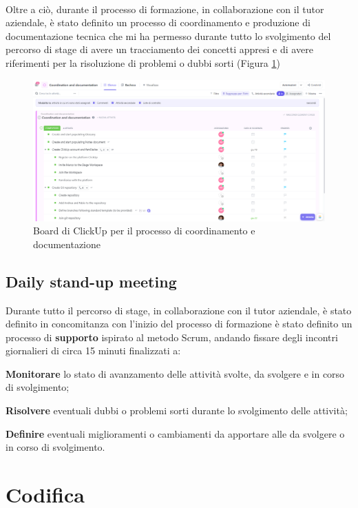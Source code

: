 \\
Oltre a ciò, durante il processo di formazione, in collaborazione con il tutor aziendale, è stato definito un processo di coordinamento e produzione di 
documentazione tecnica che mi ha permesso durante tutto lo svolgimento del percorso di stage di avere un tracciamento dei concetti appresi 
e di avere riferimenti per la risoluzione di problemi o dubbi sorti (Figura \ref{cap:Documentazione})
\begin{figure}[h]
    \centering
    \includegraphics[width=1\textwidth]{images/percorso/coordinamento.png}
    \caption{Board di ClickUp per il processo di coordinamento e documentazione}
    \label{cap:Documentazione}
\end{figure}
\subsection{Daily stand-up meeting}
Durante tutto il percorso di stage, in collaborazione con il tutor aziendale, è stato definito in concomitanza con l'inizio del processo di formazione
è stato definito un processo di \textbf{supporto} ispirato al metodo \gls{Scrum}{}, andando fissare degli incontri giornalieri di circa 15 minuti finalizzati a:
\begin{list}{*}
    \item \textbf{Monitorare} lo stato di avanzamento delle attività svolte, da svolgere e in corso di svolgimento;
    \item \item \textbf{Risolvere} eventuali dubbi o problemi sorti durante lo svolgimento delle attività;
    \item \textbf{Definire} eventuali miglioramenti o cambiamenti da apportare alle da svolgere o in corso di svolgimento.
\end{list}
\section{Codifica}
